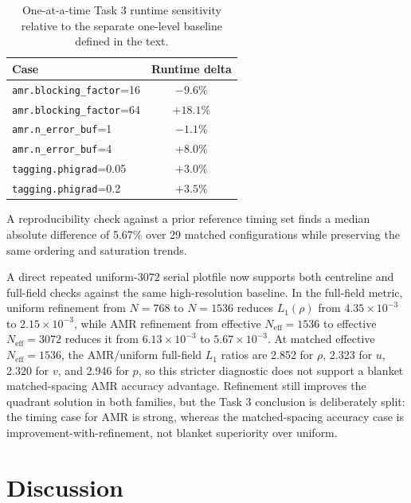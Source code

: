 \documentclass[final,3p,times,twocolumn]{elsarticle}
\newif\ifwithpaths
\DeclareRobustCommand{\pathnote}[1]{\ifwithpaths\textit{ [source: \nolinkurl{#1}]}\fi}
\begin{document}
\begin{table}[!htbp]
\centering
\small
\begin{tabular}{@{}l c@{}}
\hline
Case & Runtime delta \\
\hline
\texttt{amr.blocking\_factor}=16 & $-9.6\%$ \\
\texttt{amr.blocking\_factor}=64 & $+18.1\%$ \\
\texttt{amr.n\_error\_buf}=1 & $-1.1\%$ \\
\texttt{amr.n\_error\_buf}=4 & $+8.0\%$ \\
\texttt{tagging.phigrad}=0.05 & $+3.0\%$ \\
\texttt{tagging.phigrad}=0.2 & $+3.5\%$ \\
\hline
\end{tabular}
\caption{One-at-a-time Task 3 runtime sensitivity relative to the separate one-level baseline defined in the text.\pathnote{Task3/outputs/report_pack_task3/sensitivity.csv; ANALYSIS_DERIVED_METRICS.md}}
\label{tab:sensitivity_delta}
\end{table}

A reproducibility check against a prior reference timing set finds a median absolute difference of 5.67\% over 29 matched configurations while preserving the same ordering and saturation trends.

A direct repeated uniform-$3072$ serial plotfile now supports both centreline and full-field checks against the same high-resolution baseline. In the full-field metric, uniform refinement from $N=768$ to $N=1536$ reduces $L_1(\rho)$ from $4.35\times10^{-3}$ to $2.15\times10^{-3}$, while AMR refinement from effective $N_\mathrm{eff}=1536$ to effective $N_\mathrm{eff}=3072$ reduces it from $6.13\times10^{-3}$ to $5.67\times10^{-3}$. At matched effective $N_\mathrm{eff}=1536$, the AMR/uniform full-field $L_1$ ratios are 2.852 for $\rho$, 2.323 for $u$, 2.320 for $v$, and 2.946 for $p$, so this stricter diagnostic does not support a blanket matched-spacing AMR accuracy advantage.\pathnote{new_campaign/Euler_AmrLevel/Exec/Euler1D/results_task3_accuracy_refresh_20260308_001536/checks/task3_fullfield_accuracy.md} Refinement still improves the quadrant solution in both families, but the Task 3 conclusion is deliberately split: the timing case for AMR is strong, whereas the matched-spacing accuracy case is improvement-with-refinement, not blanket superiority over uniform.

\FloatBarrier

\section{Discussion}
\label{sec:discussion}
\end{document}
